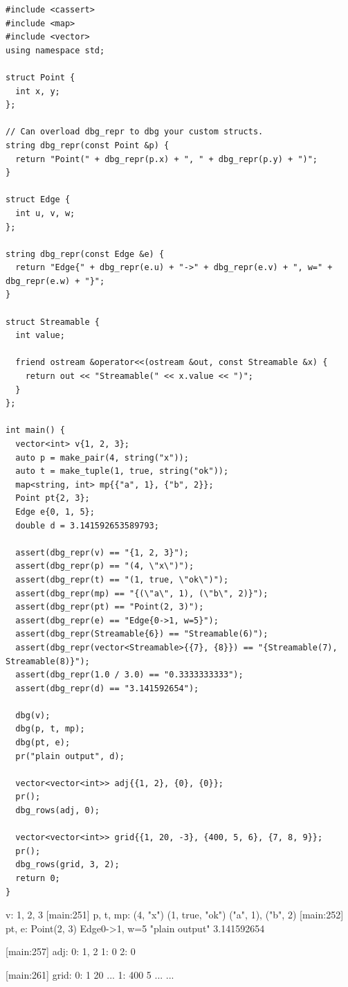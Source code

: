 \begin{lstlisting}[style=cpp]
#include <cassert>
#include <map>
#include <vector>
using namespace std;

struct Point {
  int x, y;
};

// Can overload dbg_repr to dbg your custom structs.
string dbg_repr(const Point &p) {
  return "Point(" + dbg_repr(p.x) + ", " + dbg_repr(p.y) + ")";
}

struct Edge {
  int u, v, w;
};

string dbg_repr(const Edge &e) {
  return "Edge{" + dbg_repr(e.u) + "->" + dbg_repr(e.v) + ", w=" + dbg_repr(e.w) + "}";
}

struct Streamable {
  int value;

  friend ostream &operator<<(ostream &out, const Streamable &x) {
    return out << "Streamable(" << x.value << ")";
  }
};

int main() {
  vector<int> v{1, 2, 3};
  auto p = make_pair(4, string("x"));
  auto t = make_tuple(1, true, string("ok"));
  map<string, int> mp{{"a", 1}, {"b", 2}};
  Point pt{2, 3};
  Edge e{0, 1, 5};
  double d = 3.141592653589793;

  assert(dbg_repr(v) == "{1, 2, 3}");
  assert(dbg_repr(p) == "(4, \"x\")");
  assert(dbg_repr(t) == "(1, true, \"ok\")");
  assert(dbg_repr(mp) == "{(\"a\", 1), (\"b\", 2)}");
  assert(dbg_repr(pt) == "Point(2, 3)");
  assert(dbg_repr(e) == "Edge{0->1, w=5}");
  assert(dbg_repr(Streamable{6}) == "Streamable(6)");
  assert(dbg_repr(vector<Streamable>{{7}, {8}}) == "{Streamable(7), Streamable(8)}");
  assert(dbg_repr(1.0 / 3.0) == "0.3333333333");
  assert(dbg_repr(d) == "3.141592654");

  dbg(v);
  dbg(p, t, mp);
  dbg(pt, e);
  pr("plain output", d);

  vector<vector<int>> adj{{1, 2}, {0}, {0}};
  pr();
  dbg_rows(adj, 0);

  vector<vector<int>> grid{{1, 20, -3}, {400, 5, 6}, {7, 8, 9}};
  pr();
  dbg_rows(grid, 3, 2);
  return 0;
}
\end{lstlisting}
\begin{exampleoutput}
[main:250] v: {1, 2, 3}
[main:251] p, t, mp: (4, "x") (1, true, "ok") {("a", 1), ("b", 2)}
[main:252] pt, e: Point(2, 3) Edge{0->1, w=5}
"plain output" 3.141592654

[main:257] adj:
0: {1, 2}
1: {0}
2: {0}

[main:261] grid:
0:   1  20 ...
1: 400   5 ...
...
\end{exampleoutput}

